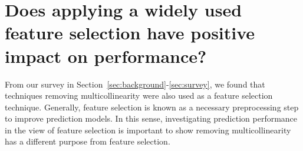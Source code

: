 
\section{ Does applying a widely used feature selection have positive impact on performance?}
\label{subsec:cfs}
From our survey in Section~\ref{sec:background}-\ref{sec:survey}, we found that techniques removing multicollinearity were also used as a feature selection technique. Generally, feature selection is known as a necessary preprocessing step to improve prediction models. In this sense, investigating prediction performance in the view of feature selection is important to show removing multicollinearity has a different purpose from feature selection.

